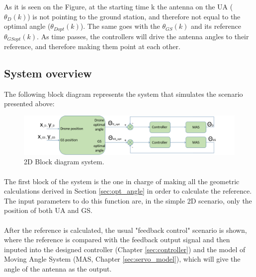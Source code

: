 As it is seen on the Figure, at the starting time k the antenna on the UA ($\theta_{D} (k)$) is not pointing to the ground station, and therefore not equal to the optimal angle ($\theta_{Dopt}(k)$). The same goes with the $\theta_{GS}(k)$ and its reference $\theta_{GSopt}(k)$. As time passes, the controllers will drive the antenna angles to their reference, and therefore making them point at each other. 

\subsection*{System overview}
The following block diagram represents the system that simulates the scenario presented above:
\begin{figure}[H]
	\centerline{
	\includegraphics[scale=0.50]{figures/2d_system.png}}
	\caption{2D Block diagram system.}
	\label{fig:2d_system}
\end{figure}

\paragraph{} The first block of the system is the one in charge of making all the geometric calculations derived in Section \ref{sec:opt_angle} in order to calculate the reference. The input parameters to do this function are, in the simple 2D scenario, only the position of both UA and GS.

\paragraph{} After the reference is calculated, the usual "feedback control" scenario is shown, where the reference is compared with the feedback output signal and then inputed into the designed controller (Chapter \ref{sec:controller}) and the model of Moving Angle System (MAS, Chapter \ref{sec:servo_model}), which will give the angle of the antenna as the output.


